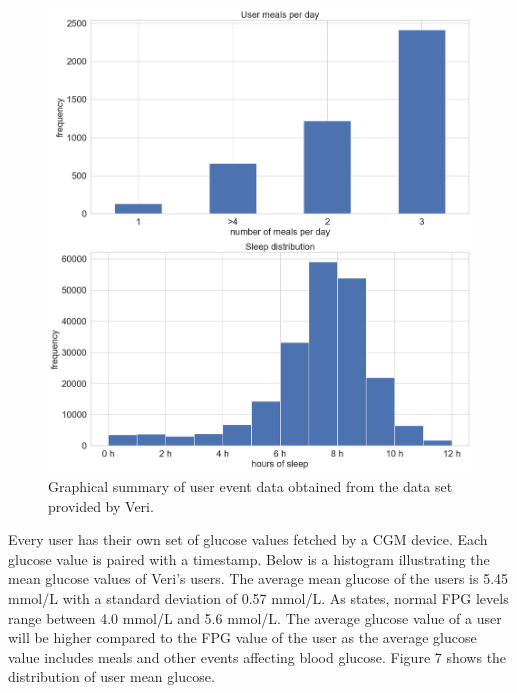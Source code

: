 \documentclass[english, 12pt, a4paper, elec, utf8, a-1b, online]{aaltothesis}
\begin{document}
\begin{figure}[H]
\centering
\includegraphics[width=14cm]{events.png}
\caption{Graphical summary of user event data obtained from the data set provided by Veri.}
\end{figure}

Every user has their own set of glucose values fetched by a CGM device. Each glucose value is paired with a timestamp. 
Below is a histogram illustrating the mean glucose values of Veri's users. The average mean glucose of the users is 5.45 mmol/L with
a standard deviation of 0.57 mmol/L. As \cite{mathew_blood_2022} states, normal FPG levels range between 4.0 mmol/L and 5.6
mmol/L. The average glucose value of a user will be higher compared to the FPG value of the user as the average glucose value
includes meals and other events affecting blood glucose. Figure 7 shows the distribution of user mean glucose.
\end{document}
